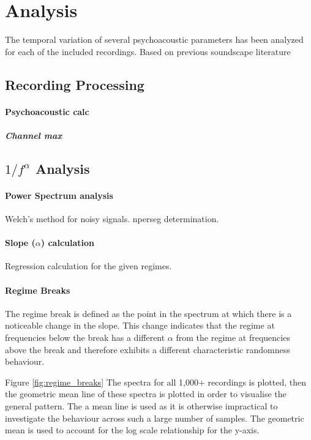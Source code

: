 \section{Analysis}
The temporal variation of several psychoacoustic parameters has been analyzed for each of the included recordings. Based on previous soundscape literature 

\subsection{Recording Processing}
\paragraph{Psychoacoustic calc}

\subparagraph{Channel max}

\subsection{$1/f^\alpha$ Analysis}
\paragraph{Power Spectrum analysis} Welch's method for noisy signals. nperseg determination.
\paragraph{Slope ($\alpha$) calculation} Regression calculation for the given regimes.

\paragraph{Regime Breaks}

The regime break is defined as the point in the spectrum at which there is a noticeable change in the slope. This change indicates that the regime at frequencies below the break has a different $\alpha$ from the regime at frequencies above the break and therefore exhibits a different characteristic randomness behaviour.

Figure \ref{fig:regime_breaks} The spectra for all 1,000+ recordings is plotted, then the geometric mean line of these spectra is plotted in order to visualise the general pattern. The a mean line is used as it is otherwise impractical to investigate the behaviour across such a large number of samples. The geometric mean is used to account for the log scale relationship for the y-axis.



